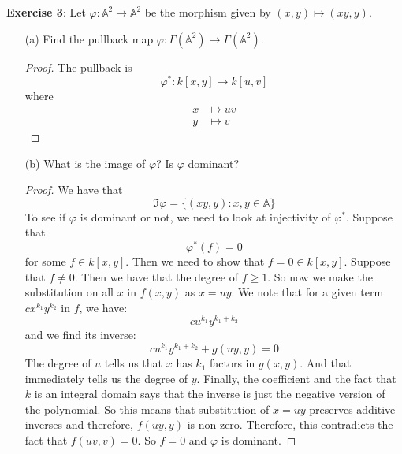 \documentclass{article}
\begin{document}
\textbf{Exercise 3}: Let $\varphi: \mathbb{A}^{2} \rightarrow \mathbb{A}^{2}$ be the morphism given by $(x, y) \mapsto (xy, y)$. 
    \begin{itemize}
        \item [(a)] Find the pullback map $\varphi : \Gamma(\mathbb{A}^{2}) \rightarrow \Gamma(\mathbb{A}^{2})$.
            \begin{proof}
                The pullback is 
                    \begin{equation*}
                        \varphi^{*} : k[x, y] \rightarrow k[u, v] 
                    \end{equation*}
                where
                    \begin{align*}
                        x &\mapsto uv \\
                        y &\mapsto v
                    \end{align*}
            \end{proof}

        \item [(b)] What is the image of $\varphi$? Is $\varphi$ dominant?
            \begin{proof}
                We have that 
                    \begin{equation*}
                        \Im{\varphi} = \{(xy, y) : x, y \in \mathbb{A}\}
                    \end{equation*}
                To see if $\varphi$ is dominant or not, we need to look at injectivity of $\varphi^{*}$. Suppose that 
                    \begin{equation*}
                        \varphi^{*}(f) = 0
                    \end{equation*}
                for some $f \in k[x, y]$. Then we need to show that $f = 0 \in k[x, y]$. Suppose that $f \neq 0$. Then we have that the degree of $f \geq 1$. So now we make the substitution on all $x$ in $f(x, y)$ as $x = uy$. We note that for a given term $cx^{k_{1}}y^{k_{2}}$ in $f$, we have:
                    \begin{equation*}
                        cu^{k_{1}}y^{k_{1} + k_{2}}
                    \end{equation*}
                and we find its inverse:
                    \begin{equation*}
                        cu^{k_{1}}y^{k_{1} + k_{2}} + g(uy, y) = 0
                    \end{equation*}
                The degree of $u$ tells us that $x$ has $k_{1}$ factors in $g(x, y)$. And that immediately tells us the degree of $y$. Finally, the coefficient and the fact that $k$ is an integral domain says that the inverse is just the negative version of the polynomial. So this means that substitution of $x = uy$ preserves additive inverses and therefore, $f(uy, y)$ is non-zero. Therefore, this contradicts the fact that $f(uv, v) = 0$. So $f = 0$ and $\varphi$ is dominant.
            \end{proof}


\end{itemize}
\end{document}
